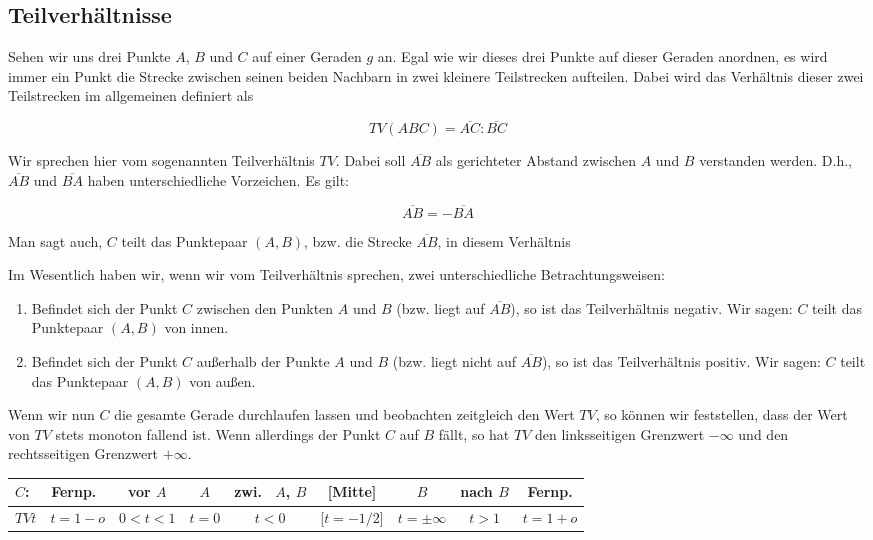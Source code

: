 \documentclass[12pt,a4paper]{article}
\begin{document}
\subsection{Teilverhältnisse}
\label{subsec:teilverh}
Sehen wir uns drei Punkte $A$, $B$ und $C$ auf einer Geraden $g$ an. Egal wie wir dieses drei Punkte auf dieser Geraden anordnen, es wird immer ein Punkt die Strecke zwischen seinen beiden Nachbarn in zwei kleinere Teilstrecken aufteilen. Dabei wird das Verhältnis dieser zwei Teilstrecken im allgemeinen definiert als

\[TV(A B C) = \overline{A C} : \overline{B C}\]

Wir sprechen hier vom sogenannten Teilverhältnis $TV$. Dabei soll $\overline{A B}$ als gerichteter Abstand zwischen $A$ und $B$ verstanden werden. D.h., $\overline{A B}$ und $\overline{B A}$ haben unterschiedliche Vorzeichen. Es gilt: 

\[\overline{A B} = -\overline{B A}\]

Man sagt auch, $C$ teilt das Punktepaar $(A , B)$, bzw. die Strecke $\overline{A B}$, in diesem Verhältnis \citep[S.~76]{projektiveGeometrie}

Im Wesentlich haben wir, wenn wir vom Teilverhältnis sprechen, zwei unterschiedliche Betrachtungsweisen:
\begin{enumerate}
\item Befindet sich der Punkt $C$ zwischen den Punkten $A$ und $B$ (bzw. liegt auf $\overline{A B}$), so ist das Teilverhältnis negativ. Wir sagen: $C$ teilt das Punktepaar $(A , B)$ \glqq von innen\grqq .
\item Befindet sich der Punkt $C$ außerhalb der Punkte $A$ und $B$ (bzw. liegt nicht auf $\overline{A B}$), so ist das Teilverhältnis positiv. Wir sagen: $C$ teilt das Punktepaar $(A , B)$ \glqq von außen\grqq .
\end{enumerate}

Wenn wir nun $C$ die gesamte Gerade durchlaufen lassen und beobachten zeitgleich den Wert $TV$, so können wir feststellen, dass der Wert von $TV$ stets monoton fallend ist. Wenn allerdings der Punkt $C$ auf $B$ fällt, so hat $TV$ den linksseitigen Grenzwert $-\infty$ und den rechtsseitigen Grenzwert $+\infty$.
\newpage
\begin{center}
\begin{scriptsize}
\begin{tabular}[htbp]{l|c|c|c|c|c|c|c|c}
$C$: & Fernp.~ & vor $A$ &  $A$ & zwi.~ $A$, $B$ & [Mitte] & $B$ & nach $B$ & Fernp.\\
\hline
$TV t$ & $t = 1 - o$ & $0 < t < 1$ & $t = 0$ & $t < 0$ & [$t = -1/2$] & $t = \pm\infty$ & $t > 1$ & $t = 1 + o$\\
\end{tabular}
\end{scriptsize}
\end{center}
\end{document}
